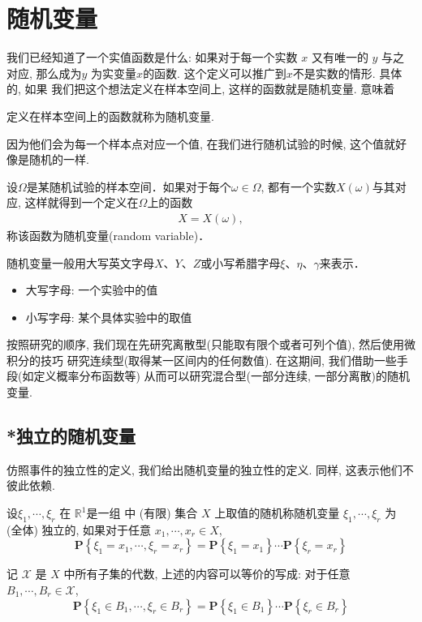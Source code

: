 \section{随机变量}

我们已经知道了一个实值函数是什么: 如果对于每一个实数 $x$ 又有唯一的 $y$ 与之对应,
那么成为$y$ 为实变量$x$的函数. 这个定义可以推广到$x$不是实数的情形. 具体的, 如果
我们把这个想法定义在样本空间上, 这样的函数就是随机变量. 意味着

\begin{definition*}
    定义在样本空间上的函数就称为随机变量.
\end{definition*}

因为他们会为每一个样本点对应一个值, 在我们进行随机试验的时候, 这个值就好像是随机的一样.

\begin{definition}[随机变量]
    设$\Omega$是某随机试验的样本空间．如果对于每个$\omega\in\Omega$, 都有一个实数$X(\omega)$与其对应, 这样就得到一个定义在$\Omega$上的函数
    \begin{align*}
        X=X(\omega),
    \end{align*}
    称该函数为随机变量(random variable)．
\end{definition}

随机变量一般用大写英文字母$X$、$Y$、$Z$或小写希腊字母$\xi$、$\eta$、$\gamma$来表示．
\begin{itemize}
    \item 大写字母: 一个实验中的值
    \item 小写字母: 某个具体实验中的取值
\end{itemize}

按照研究的顺序, 我们现在先研究离散型(只能取有限个或者可列个值), 然后使用微积分的技巧
研究连续型(取得某一区间内的任何数值). 在这期间, 我们借助一些手段(如定义概率分布函数等)
从而可以研究混合型(一部分连续, 一部分离散)的随机变量.

\subsection{*独立的随机变量}

仿照事件的独立性的定义, 我们给出随机变量的独立性的定义. 同样, 这表示他们不彼此依赖. 

\begin{definition}
    设$\xi_1, \cdots, \xi_r$ 在 $\mathbb{R}^1$是一组  中 (有限) 集合 $X$ 上取值的随机称随机变量 $\xi_1, \cdots, \xi_r$ 为 (全体) 独立的, 如果对于任意 $x_1, \cdots, x_r \in X$,
$$
\mathbf{P}\left\{\xi_1=x_1, \cdots, \xi_r=x_r\right\}=\mathbf{P}\left\{\xi_1=x_1\right\} \cdots \mathbf{P}\left\{\xi_r=x_r\right\}
$$
\end{definition}

\begin{shaded}
    记 $\mathscr{X}$ 是 $X$ 中所有子集的代数, 上述的内容可以等价的写成: 对于任意 $B_1, \cdots, B_r \in \mathscr{X}$,
    $$
    \mathbf{P}\left\{\xi_1 \in B_1, \cdots, \xi_r \in B_r\right\}=\mathbf{P}\left\{\xi_1 \in B_1\right\} \cdots \mathbf{P}\left\{\xi_r \in B_r\right\}
    $$
\end{shaded}